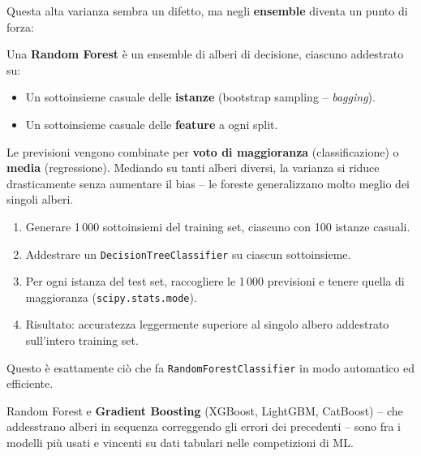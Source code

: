 Questa alta varianza sembra un difetto, ma negli \textbf{ensemble} diventa un punto di forza:

\begin{defbox}
Una \textbf{Random Forest} è un ensemble di alberi di decisione, ciascuno addestrato su:
\begin{itemize}
    \item Un sottoinsieme casuale delle \textbf{istanze} (bootstrap sampling -- \emph{bagging}).
    \item Un sottoinsieme casuale delle \textbf{feature} a ogni split.
\end{itemize}
Le previsioni vengono combinate per \textbf{voto di maggioranza} (classificazione) o \textbf{media} (regressione). Mediando su tanti alberi diversi, la varianza si riduce drasticamente senza aumentare il bias -- le foreste generalizzano molto meglio dei singoli alberi.
\end{defbox}

\begin{exbox}
\begin{enumerate}
    \item Generare 1\,000 sottoinsiemi del training set, ciascuno con 100 istanze casuali.
    \item Addestrare un \texttt{DecisionTreeClassifier} su ciascun sottoinsieme.
    \item Per ogni istanza del test set, raccogliere le 1\,000 previsioni e tenere quella di maggioranza (\texttt{scipy.stats.mode}).
    \item Risultato: accuratezza leggermente superiore al singolo albero addestrato sull'intero training set.
\end{enumerate}
Questo è esattamente ciò che fa \texttt{RandomForestClassifier} in modo automatico ed efficiente.
\end{exbox}

Random Forest e \textbf{Gradient Boosting} (XGBoost, LightGBM, CatBoost) -- che addesstrano alberi in sequenza correggendo gli errori dei precedenti -- sono fra i modelli più usati e vincenti su dati tabulari nelle competizioni di ML.